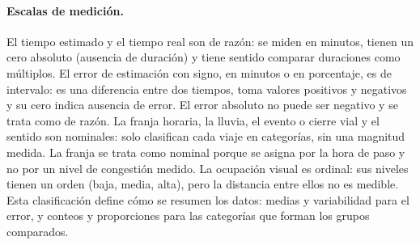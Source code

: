 \paragraph{Escalas de medición.}
El tiempo estimado y el tiempo real son de razón: se miden en minutos, tienen un cero absoluto (ausencia de duración) y tiene sentido comparar duraciones como múltiplos. El error de estimación con signo, en minutos o en porcentaje, es de intervalo: es una diferencia entre dos tiempos, toma valores positivos y negativos y su cero indica ausencia de error. El error absoluto no puede ser negativo y se trata como de razón. La franja horaria, la lluvia, el evento o cierre vial y el sentido son nominales: solo clasifican cada viaje en categorías, sin una magnitud medida. La franja se trata como nominal porque se asigna por la hora de paso y no por un nivel de congestión medido. La ocupación visual es ordinal: sus niveles tienen un orden (baja, media, alta), pero la distancia entre ellos no es medible. Esta clasificación define cómo se resumen los datos: medias y variabilidad para el error, y conteos y proporciones para las categorías que forman los grupos comparados.